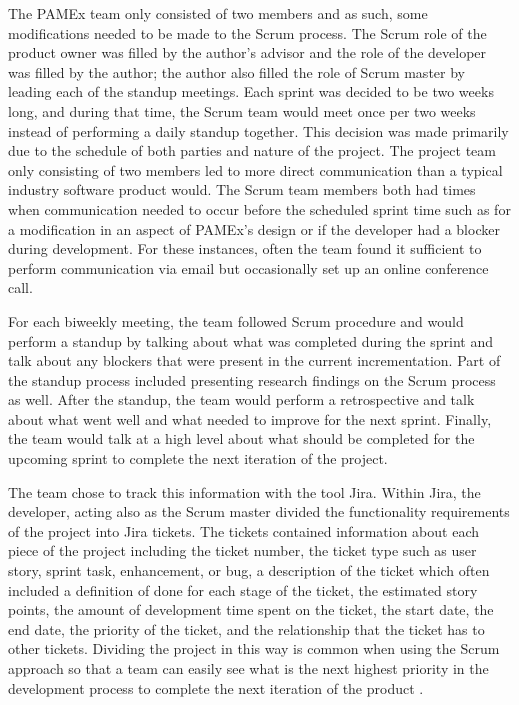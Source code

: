 The PAMEx team only consisted of two members and as such, some modifications needed to be made to the Scrum 
process. The Scrum role of the product owner was filled by the author’s 
advisor and the role of the developer was filled by the author; the 
author also filled the role of Scrum master by leading each of the 
standup meetings. Each sprint was decided to be two weeks long, and 
during that time, the Scrum team would meet once per two 
weeks instead of performing a daily standup together. This decision 
was made primarily due to the schedule of both parties and nature 
of the project. The project team only consisting of two members 
led to more direct communication than a typical industry software 
product would. The Scrum team members both had times when communication 
needed to occur before the scheduled sprint time such as for a 
modification in an aspect of PAMEx’s design or if the developer had a 
blocker during development. For these instances, often the team found it sufficient to perform communication via email but 
occasionally set up an online conference call.  

For each biweekly meeting, the team followed Scrum procedure and would perform a standup by 
talking about what was completed during the sprint \cite{lacey2015} and talk 
about any blockers that were present in the current incrementation. Part of the standup 
process included presenting research findings on the 
Scrum process as well. After the standup, the team would 
perform a retrospective and talk about what went well and what needed 
to improve for the next sprint. Finally, the team would 
talk at a high level about what should be completed for the upcoming 
sprint to complete the next iteration of the project. 

The team chose to track this information with the tool Jira. Within 
Jira, the developer, acting also as the Scrum master divided the functionality requirements of the project 
into Jira tickets. The tickets contained information about each piece of 
the project including the ticket number, the ticket type such as user 
story, sprint task, enhancement, or bug, a description of the ticket 
which often included a definition of done for each stage of the ticket, 
the estimated story points, the amount of development time spent on the 
ticket, the start date, the end date, the priority of the ticket, and 
the relationship that the ticket has to other tickets. Dividing the project
in this way is common when using the Scrum approach so that a team can
easily see what is the next highest priority in the development process to 
complete the next iteration of the product \cite{lacey2015}.

